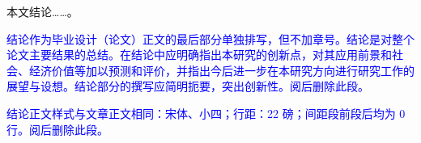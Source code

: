 
\begin{conclusion}

  本文结论……。\cite{李成智2004飞行之梦}

  \textcolor{blue}{结论作为毕业设计（论文）正文的最后部分单独排写，但不加章号。结论是对整个论文主要结果的总结。在结论中应明确指出本研究的创新点，对其应用前景和社会、经济价值等加以预测和评价，并指出今后进一步在本研究方向进行研究工作的展望与设想。结论部分的撰写应简明扼要，突出创新性。阅后删除此段。}

  \textcolor{blue}{结论正文样式与文章正文相同：宋体、小四；行距：22 磅；间距段前段后均为 0 行。阅后删除此段。}
\end{conclusion}
